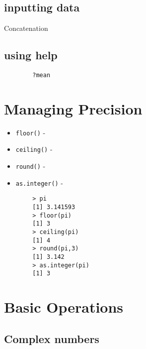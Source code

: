 \documentclass[a4paper,12pt]{article}
\begin{document}
	
	
	\subsection{inputting data}
	Concatenation
	
	\subsection{using help}
	
	\begin{framed}
		\begin{verbatim}
		?mean
		\end{verbatim}
	\end{framed}
	
	
	
	\newpage
	\section{Managing Precision}
	\begin{itemize}
		\item \texttt{floor()} - 
		\item \texttt{ceiling()} - 
		\item \texttt{round()} - 
		\item \texttt{as.integer()} -
	\end{itemize}
	
	\begin{framed}
		\begin{verbatim}
		> pi
		[1] 3.141593
		> floor(pi)
		[1] 3
		> ceiling(pi)
		[1] 4
		> round(pi,3)
		[1] 3.142
		> as.integer(pi)
		[1] 3
		\end{verbatim}
	\end{framed}
	
	\section{Basic Operations}
	\subsection{Complex numbers}
\end{document}
